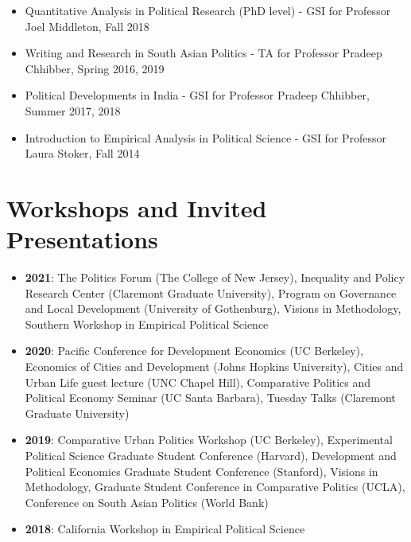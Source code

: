 \documentclass[11pt]{article}
\begin{document}
\begin{itemize}[nosep]
	\item[]Quantitative Analysis in Political Research (PhD level) - GSI for Professor Joel Middleton, Fall 2018 
		\item[]Writing and Research in South Asian Politics - TA for Professor Pradeep Chhibber, Spring 2016, 2019
	\item[] Political Developments in India - GSI for Professor Pradeep Chhibber, Summer 2017, 2018
	\item[]Introduction to Empirical Analysis in Political Science - GSI for Professor Laura Stoker, Fall 2014	
\end{itemize}

\vspace{2mm}

\color{MidnightBlue}

\section*{Workshops and Invited Presentations}
\color{Black}
\begin{itemize}
\item[] \textbf{2021}: The Politics Forum (The College of New Jersey), Inequality and Policy Research Center (Claremont Graduate University), Program on Governance and Local Development (University of Gothenburg), Visions in Methodology, Southern Workshop in Empirical Political Science
\item[] \textbf{2020}: Pacific Conference for Development Economics (UC Berkeley), Economics of Cities and Development (Johns Hopkins University), Cities and Urban Life guest lecture (UNC Chapel Hill), Comparative Politics and Political Economy Seminar (UC Santa Barbara), Tuesday Talks (Claremont Graduate University)
\item[] \textbf{2019}: Comparative Urban Politics Workshop (UC Berkeley), Experimental Political Science Graduate Student Conference (Harvard), Development and Political Economics Graduate Student Conference (Stanford), Visions in Methodology, Graduate Student Conference in Comparative Politics (UCLA), Conference on South Asian Politics (World Bank)
\item[] \textbf{2018}: California Workshop in Empirical Political Science
\end{itemize}

\vspace{2mm}

\color{MidnightBlue}
\end{document}
